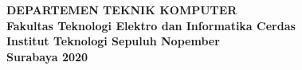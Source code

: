 \begin{flushleft}
  \noindent\textbf{DEPARTEMEN TEKNIK KOMPUTER} \\
  \textbf{Fakultas Teknologi Elektro dan Informatika Cerdas} \\
  \textbf{Institut Teknologi Sepuluh Nopember} \\
  \textbf{Surabaya 2020}

\end{flushleft}

\restoregeometry

